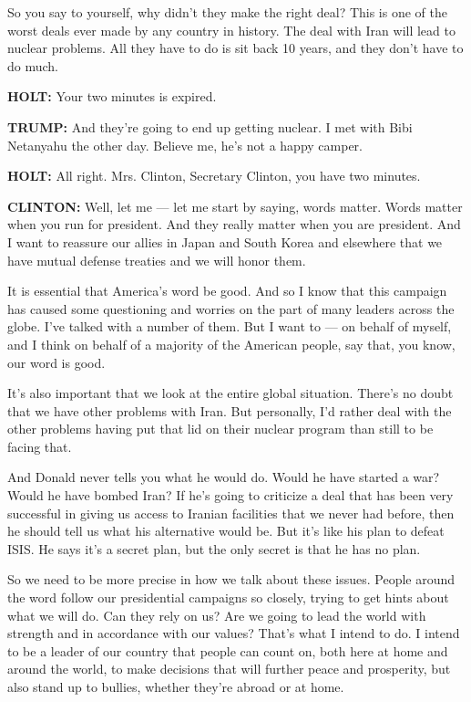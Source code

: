 So you say to yourself, why didn't they make the right deal? This is one
of the worst deals ever made by any country in history. The deal with
Iran will lead to nuclear problems. All they have to do is sit back 10
years, and they don't have to do much.

\textbf{HOLT:} Your two minutes is expired.

\textbf{TRUMP:} And they're going to end up getting nuclear. I met with
Bibi Netanyahu the other day. Believe me, he's not a happy camper.

\textbf{HOLT:} All right. Mrs. Clinton, Secretary Clinton, you have two
minutes.

\textbf{CLINTON:} Well, let me --- let me start by saying, words matter.
Words matter when you run for president. And they really matter when you
are president. And I want to reassure our allies in Japan and South
Korea and elsewhere that we have mutual defense treaties and we will
honor them.

It is essential that America's word be good. And so I know that this
campaign has caused some questioning and worries on the part of many
leaders across the globe. I've talked with a number of them. But I want
to --- on behalf of myself, and I think on behalf of a majority of the
American people, say that, you know, our word is good.

It's also important that we look at the entire global situation. There's
no doubt that we have other problems with Iran. But personally, I'd
rather deal with the other problems having put that lid on their nuclear
program than still to be facing that.

And Donald never tells you what he would do. Would he have started a
war? Would he have bombed Iran? If he's going to criticize a deal that
has been very successful in giving us access to Iranian facilities that
we never had before, then he should tell us what his alternative would
be. But it's like his plan to defeat ISIS. He says it's a secret plan,
but the only secret is that he has no plan.

So we need to be more precise in how we talk about these issues. People
around the word follow our presidential campaigns so closely, trying to
get hints about what we will do. Can they rely on us? Are we going to
lead the world with strength and in accordance with our values? That's
what I intend to do. I intend to be a leader of our country that people
can count on, both here at home and around the world, to make decisions
that will further peace and prosperity, but also stand up to bullies,
whether they're abroad or at home.

